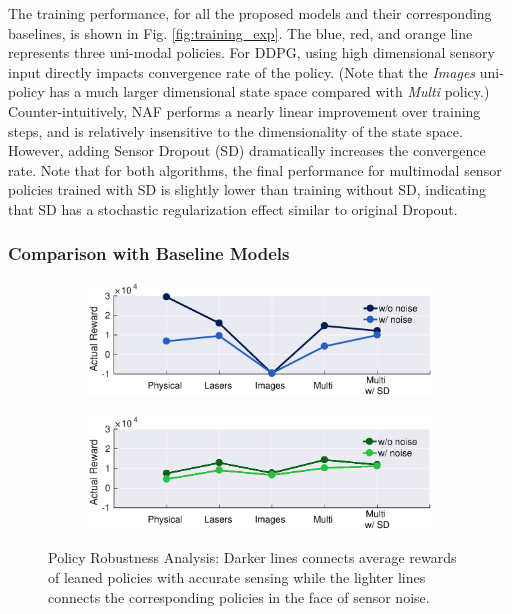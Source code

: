 \documentclass[../thesis.tex]{subfiles}
\begin{document}
The training performance, for all the proposed models and their corresponding baselines, is shown in Fig. \ref{fig:training_exp}. The blue, red, and orange line represents three uni-modal policies. 
For DDPG, using high dimensional sensory input directly impacts convergence rate of the policy. (Note that the \textit{Images} uni-policy has a much larger dimensional state space compared with \textit{Multi} policy.) 
Counter-intuitively, NAF performs a nearly linear improvement over training steps, and is relatively insensitive to the dimensionality of the state space. However, adding Sensor Dropout (SD) dramatically increases the convergence rate.
Note that for both algorithms, the final performance for multimodal sensor policies trained with SD is slightly lower than training without SD, indicating that SD has a stochastic regularization effect similar to original Dropout.


\subsubsection{Comparison with Baseline Models}

\begin{figure}[t]
    \centering
    \begin{subfigure}[b]{0.48\linewidth}
        \includegraphics[width=\columnwidth,trim= 45 180 45 10, clip=true]{./MultimodalDRL/fig/actual_robust_naf}
        \label{fig:actual_robust_naf}
    \end{subfigure}
    \begin{subfigure}[b]{0.48\linewidth}
        \includegraphics[width=\columnwidth,trim= 45 180 45 10, clip=true]{./MultimodalDRL/fig/actual_robust_ddpg}
        \label{fig:actual_robust_ddpg}
    \end{subfigure}
    \caption{Policy Robustness Analysis: Darker lines connects average rewards of leaned policies with accurate sensing while the lighter lines connects the corresponding policies in the face of sensor noise.}
    \label{fig:actual_robust}
\end{figure}
\end{document}
